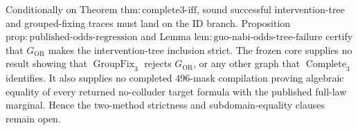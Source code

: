 Conditionally on Theorem \(\mathrm{thm{:}complete3\text{-}iff}\), sound successful intervention-tree and grouped-fixing traces must land on the \(\mathrm{ID}\) branch. Proposition \(\mathrm{prop{:}published\text{-}odds\text{-}regression}\) and Lemma \(\mathrm{lem{:}guo\text{-}nabi\text{-}odds\text{-}tree\text{-}failure}\) certify that \(G_{\mathrm{OR}}\) makes the intervention-tree inclusion strict. The frozen core supplies no result showing that \(\operatorname{GroupFix}_3\) rejects \(G_{\mathrm{OR}}\), or any other graph that \(\operatorname{Complete}_3\) identifies. It also supplies no completed \(496\)-mask compilation proving algebraic equality of every returned no-colluder target formula with the published full-law marginal. Hence the two-method strictness and subdomain-equality clauses remain open.